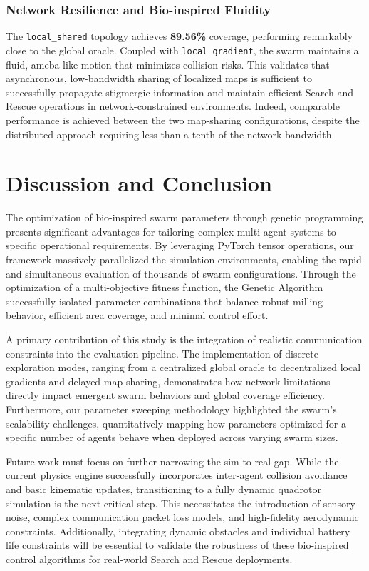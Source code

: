 \documentclass[conference]{IEEEtran}
\begin{document}
\subsubsection{Network Resilience and Bio-inspired Fluidity}
The \texttt{local\_shared} topology achieves \textbf{89.56\%} coverage, performing remarkably close to the global oracle. Coupled with \texttt{local\_gradient}, the swarm maintains a fluid, ameba-like motion that minimizes collision risks. This validates that asynchronous, low-bandwidth sharing of localized maps is sufficient to successfully propagate stigmergic information and maintain efficient Search and Rescue operations in network-constrained environments. Indeed, comparable performance is achieved between the two map-sharing configurations, despite the distributed approach requiring less than a tenth of the network bandwidth

\clearpage
\section{Discussion and Conclusion}
\label{sec:conclusion}

The optimization of bio-inspired swarm parameters through genetic programming presents significant advantages for tailoring complex multi-agent systems to specific operational requirements. By leveraging PyTorch tensor operations, our framework massively parallelized the simulation environments, enabling the rapid and simultaneous evaluation of thousands of swarm configurations. Through the optimization of a multi-objective fitness function, the Genetic Algorithm successfully isolated parameter combinations that balance robust milling behavior, efficient area coverage, and minimal control effort.

A primary contribution of this study is the integration of realistic communication constraints into the evaluation pipeline. The implementation of discrete exploration modes, ranging from a centralized global oracle to decentralized local gradients and delayed map sharing, demonstrates how network limitations directly impact emergent swarm behaviors and global coverage efficiency. Furthermore, our parameter sweeping methodology highlighted the swarm's scalability challenges, quantitatively mapping how parameters optimized for a specific number of agents behave when deployed across varying swarm sizes.

Future work must focus on further narrowing the sim-to-real gap. While the current physics engine successfully incorporates inter-agent collision avoidance and basic kinematic updates, transitioning to a fully dynamic quadrotor simulation is the next critical step. This necessitates the introduction of sensory noise, complex communication packet loss models, and high-fidelity aerodynamic constraints. Additionally, integrating dynamic obstacles and individual battery life constraints will be essential to validate the robustness of these bio-inspired control algorithms for real-world Search and Rescue deployments.
\end{document}
